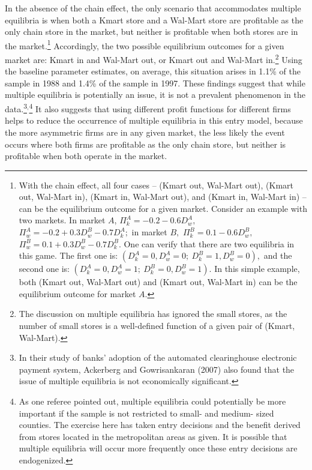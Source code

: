 \documentclass[notitlepage,onecolumn,11pt]{article}
\begin{document}
In the absence of the chain effect, the only scenario that accommodates
multiple equilibria is when both a Kmart store and a Wal-Mart store are
profitable as the only chain store in the market, but neither is profitable
when both stores are in the market.\footnote{%
With the chain effect, all four cases -- (Kmart out, Wal-Mart out), (Kmart
out, Wal-Mart in), (Kmart in, Wal-Mart out), and (Kmart in, Wal-Mart in) --
can be the equilibrium outcome for a given market. Consider an example with
two markets. In market $A$, $\Pi _{k}^{A}=-0.2-0.6D_{w}^{A},$ $\Pi
_{w}^{A}=-0.2+0.3D_{w}^{B}-0.7D_{k}^{A};$ in market $B,$ $\Pi
_{k}^{B}=0.1-0.6D_{w}^{B},$ $\Pi _{w}^{B}=0.1+0.3D_{w}^{B}-0.7D_{k}^{B}.$
One can verify that there are two equilibria in this game. The first one is: 
$(D_{k}^{A}=0,D_{w}^{A}=0;~D_{k}^{B}=1,D_{w}^{B}=0),$ and the second one is: 
$(D_{k}^{A}=0,D_{w}^{A}=1;~D_{k}^{B}=0,D_{w}^{B}=1).$ In this simple
example, both (Kmart out, Wal-Mart out) and (Kmart out, Wal-Mart in) can be
the equilibrium outcome for market $A.$\label{NonUnique}} Accordingly, the
two possible equilibrium outcomes for a given market are: Kmart in and
Wal-Mart out, or Kmart out and Wal-Mart in.\footnote{%
The discussion on multiple equilibria has ignored the small stores, as the
number of small stores is a well-defined function of a given pair of (Kmart,
Wal-Mart).} Using the baseline parameter estimates, on average, this
situation arises in 1.1\% of the sample in 1988 and 1.4\% of the sample in
1997. These findings suggest that while multiple equilibria is potentially
an issue, it is not a prevalent phenomenon in the data.\footnote{%
In their study of banks' adoption of the automated clearinghouse electronic
payment system, Ackerberg and Gowrisankaran (2007) also found that the issue
of multiple equilibria is not economically significant.}$^{,}$\footnote{%
As one referee pointed out, multiple equilibria could potentially be more
important if the sample is not restricted to small- and medium- sized
counties. The exercise here has taken entry decisions and the benefit
derived from stores located in the metropolitan areas as given. It is
possible that multiple equilibria will occur more frequently once these
entry decisions are endogenized.} It also suggests that using different
profit functions for different firms helps to reduce the occurrence of
multiple equilibria in this entry model, because the more asymmetric firms
are in any given market, the less likely the event occurs where both firms
are profitable as the only chain store, but neither is profitable when both
operate in the market.
\end{document}

